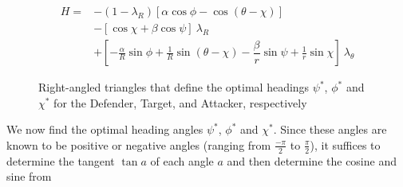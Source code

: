 \begin{equation*}
	\begin{split}
		H = & -(1-\lambda_R) [\alpha \cos \phi - \cos(\theta - \chi)]\\
		& - [\cos\chi + \beta \cos \psi ]\ \lambda_R \\
		& + [-\frac{\alpha}{R} \sin \phi + \frac{1}{R} \sin (\theta - \chi) - \dfrac{\beta}{r} \sin \psi + \frac{1}{r} \sin \chi ]\ \lambda_\theta 
	\end{split}
\end{equation*}

\begin{figure}[ht!]
	\centering
	\newcommand{\pythagwidth}{4cm}
	\newcommand{\pythagheight}{3cm}
\caption{Right-angled triangles that define the optimal headings $\psi^*$, $\phi^*$ and $\chi^*$ for the Defender, Target, and Attacker, respectively}
\label{optimal heading angles}
\end{figure}





We now find the optimal heading angles $\psi^*$, $\phi^*$ and $\chi^*$. Since these angles are known to be positive or negative angles (ranging from $\frac{-\pi}{2}$ to $\frac{\pi}{2}$), it suffices to determine the tangent $\tan a$ of each angle $a$ and then determine the cosine and sine from

